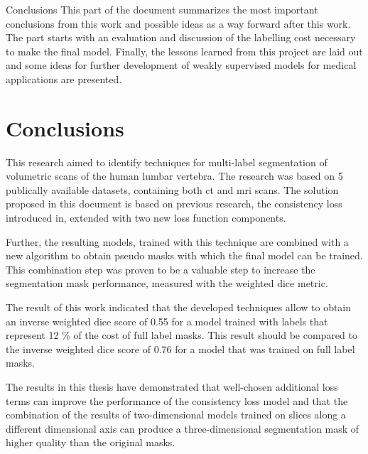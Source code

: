 \begin{partwithabstract}{Conclusions}
    This part of the document summarizes the most important conclusions from this work and possible ideas as a way forward after this work.
    The part starts with an evaluation and discussion of the labelling cost necessary to make the final model. 
    Finally, the lessons learned from this project are laid out and some ideas for further development of weakly supervised models for medical applications are presented. 
\end{partwithabstract}
\restoregeometry

\chapter{Conclusions}
\par{
    This research aimed to identify techniques for multi-label segmentation of volumetric scans of the human lumbar vertebra.
    The research was based on 5 publically available datasets, containing both \acrshort{ct} and \acrshort{mri} scans.
    The solution proposed in this document is based on previous research, the consistency loss introduced in\cite{Laradji2021}, extended with two new loss function components.  
}
\par{
    Further, the resulting models, trained with this technique are combined with a new algorithm to obtain pseudo masks with which the final model can be trained.
    This combination step was proven to be a valuable step to increase the segmentation mask performance, measured with the weighted dice metric.
}
\par{
    The result of this work indicated that the developed techniques allow to obtain an inverse weighted dice score of 0.55 for a model trained with labels that represent 12 \% of the cost of full label masks.
    This result should be compared to the inverse weighted dice score of 0.76 for a model that was trained on full label masks.
}
\par{
    The results in this thesis have demonstrated that well-chosen additional loss terms can improve the performance of the consistency loss model and 
    that the combination of the results of two-dimensional models trained on slices along a different dimensional axis can produce a three-dimensional segmentation mask of higher quality than the original masks.
}

